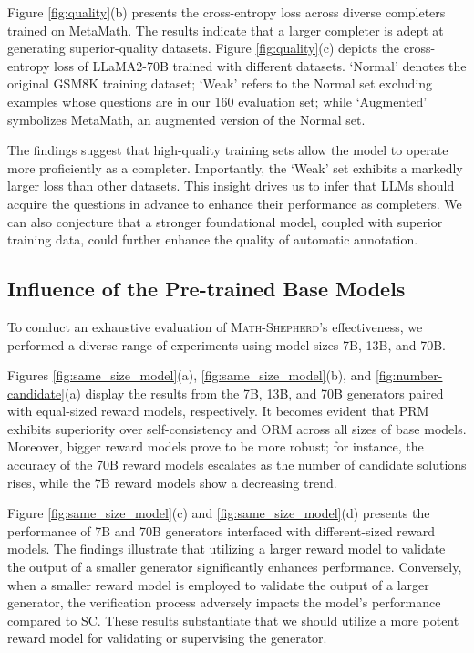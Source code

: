 Figure \ref{fig:quality}(b) presents the cross-entropy loss across diverse completers trained on MetaMath. The results indicate that a larger completer is adept at generating superior-quality datasets. Figure \ref{fig:quality}(c) depicts the cross-entropy loss of LLaMA2-70B trained with different datasets. `Normal' denotes the original GSM8K training dataset; `Weak' refers to the Normal set excluding examples whose questions are in our 160 evaluation set; while `Augmented' symbolizes MetaMath, an augmented version of the Normal set.

The findings suggest that high-quality training sets allow the model to operate more proficiently as a completer. Importantly, the `Weak' set exhibits a markedly larger loss than other datasets. This insight drives us to infer that LLMs should acquire the questions in advance to enhance their performance as completers. We can also conjecture that a stronger foundational model, coupled with superior training data, could further enhance the quality of automatic annotation.

\subsection{Influence of the Pre-trained Base Models}

To conduct an exhaustive evaluation of \textsc{Math-Shepherd}'s effectiveness, we performed a diverse range of experiments using model sizes 7B, 13B, and 70B.

Figures \ref{fig:same_size_model}(a), \ref{fig:same_size_model}(b), and \ref{fig:number-candidate}(a) display the results from the 7B, 13B, and 70B generators paired with equal-sized reward models, respectively. It becomes evident that PRM exhibits superiority over self-consistency and ORM across all sizes of base models. Moreover, bigger reward models prove to be more robust; for instance, the accuracy of the 70B reward models escalates as the number of candidate solutions rises, while the 7B reward models show a decreasing trend.

Figure \ref{fig:same_size_model}(c) and \ref{fig:same_size_model}(d) presents the performance of 7B and 70B generators interfaced with different-sized reward models. The findings illustrate that utilizing a larger reward model to validate the output of a smaller generator significantly enhances performance. Conversely, when a smaller reward model is employed to validate the output of a larger generator, the verification process adversely impacts the model's performance compared to SC. These results substantiate that we should utilize a more potent reward model for validating or supervising the generator.

